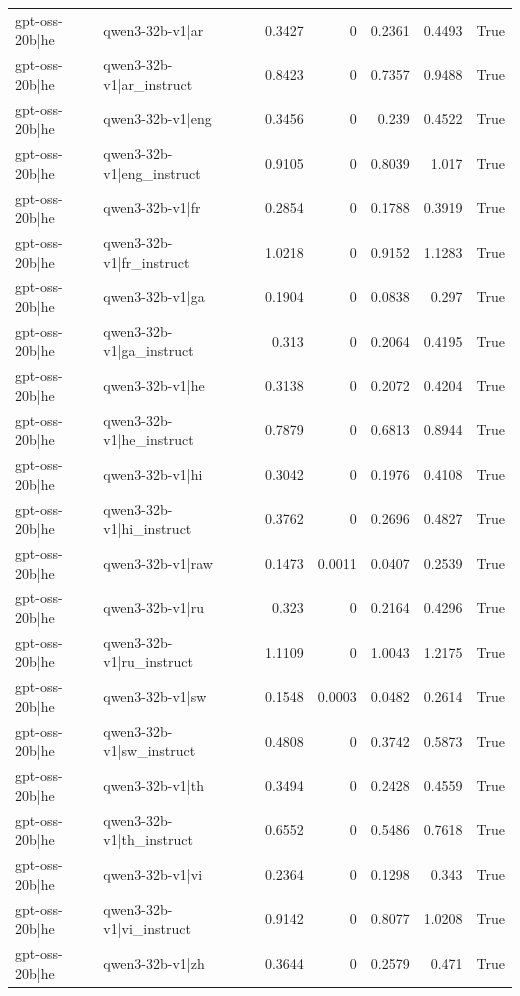 \begin{table}
\begin{tabular}{l l r r r r l}
gpt-oss-20b|he & qwen3-32b-v1|ar & 0.3427 & 0 & 0.2361 & 0.4493 & True \\
gpt-oss-20b|he & qwen3-32b-v1|ar_instruct & 0.8423 & 0 & 0.7357 & 0.9488 & True \\
gpt-oss-20b|he & qwen3-32b-v1|eng & 0.3456 & 0 & 0.239 & 0.4522 & True \\
gpt-oss-20b|he & qwen3-32b-v1|eng_instruct & 0.9105 & 0 & 0.8039 & 1.017 & True \\
gpt-oss-20b|he & qwen3-32b-v1|fr & 0.2854 & 0 & 0.1788 & 0.3919 & True \\
gpt-oss-20b|he & qwen3-32b-v1|fr_instruct & 1.0218 & 0 & 0.9152 & 1.1283 & True \\
gpt-oss-20b|he & qwen3-32b-v1|ga & 0.1904 & 0 & 0.0838 & 0.297 & True \\
gpt-oss-20b|he & qwen3-32b-v1|ga_instruct & 0.313 & 0 & 0.2064 & 0.4195 & True \\
gpt-oss-20b|he & qwen3-32b-v1|he & 0.3138 & 0 & 0.2072 & 0.4204 & True \\
gpt-oss-20b|he & qwen3-32b-v1|he_instruct & 0.7879 & 0 & 0.6813 & 0.8944 & True \\
gpt-oss-20b|he & qwen3-32b-v1|hi & 0.3042 & 0 & 0.1976 & 0.4108 & True \\
gpt-oss-20b|he & qwen3-32b-v1|hi_instruct & 0.3762 & 0 & 0.2696 & 0.4827 & True \\
gpt-oss-20b|he & qwen3-32b-v1|raw & 0.1473 & 0.0011 & 0.0407 & 0.2539 & True \\
gpt-oss-20b|he & qwen3-32b-v1|ru & 0.323 & 0 & 0.2164 & 0.4296 & True \\
gpt-oss-20b|he & qwen3-32b-v1|ru_instruct & 1.1109 & 0 & 1.0043 & 1.2175 & True \\
gpt-oss-20b|he & qwen3-32b-v1|sw & 0.1548 & 0.0003 & 0.0482 & 0.2614 & True \\
gpt-oss-20b|he & qwen3-32b-v1|sw_instruct & 0.4808 & 0 & 0.3742 & 0.5873 & True \\
gpt-oss-20b|he & qwen3-32b-v1|th & 0.3494 & 0 & 0.2428 & 0.4559 & True \\
gpt-oss-20b|he & qwen3-32b-v1|th_instruct & 0.6552 & 0 & 0.5486 & 0.7618 & True \\
gpt-oss-20b|he & qwen3-32b-v1|vi & 0.2364 & 0 & 0.1298 & 0.343 & True \\
gpt-oss-20b|he & qwen3-32b-v1|vi_instruct & 0.9142 & 0 & 0.8077 & 1.0208 & True \\
gpt-oss-20b|he & qwen3-32b-v1|zh & 0.3644 & 0 & 0.2579 & 0.471 & True \\

\end{tabular}
\end{table}
